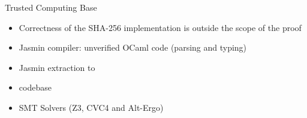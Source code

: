 \begin{frame}{Trusted Computing Base}
  \begin{itemize}
    \setlength{\itemsep}{4mm}
    \item Correctness of the SHA-256 implementation is outside the
      scope of the proof
    \item Jasmin compiler: unverified OCaml code (parsing and typing)
    \item Jasmin extraction to \EasyCrypt
    \item \EasyCrypt codebase
    \item SMT Solvers (Z3, CVC4 and Alt-Ergo)
  \end{itemize}
\end{frame}
